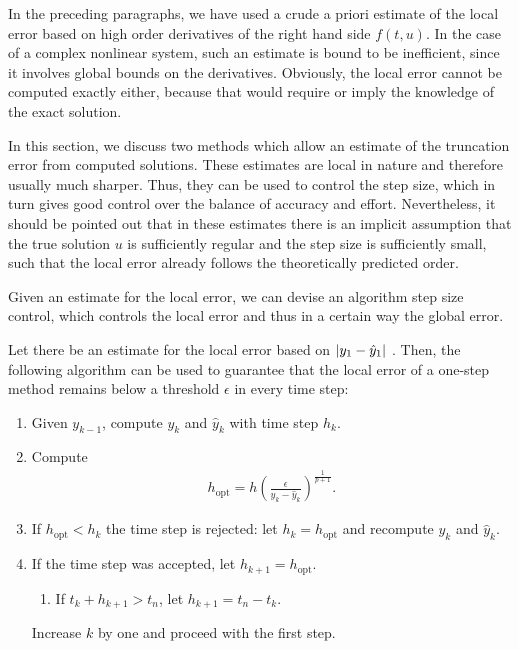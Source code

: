 \begin{intro}
  In the preceding paragraphs, we have used a crude a priori estimate
  of the local error based on high order derivatives of the right hand
  side $f(t,u)$. In the case of a complex nonlinear system, such an
  estimate is bound to be inefficient, since it involves global bounds
  on the derivatives. Obviously, the local error cannot be computed
  exactly either, because that would require or imply the knowledge of
  the exact solution.

  In this section, we discuss two methods which allow an estimate of
  the truncation error from computed solutions. These estimates are
  local in nature and therefore usually much sharper. Thus, they can
  be used to control the step size, which in turn gives good control
  over the balance of accuracy and effort. Nevertheless, it should be
  pointed out that in these estimates there is an implicit assumption
  that the true solution $u$ is sufficiently regular and the step size
  is sufficiently small, such that the local error already follows
  the theoretically predicted order.

  Given an estimate for the local error, we can devise an algorithm
  step size control, which controls the local error and thus in a
  certain way the global error.
\end{intro}

\begin{algorithm}
  Let there be an estimate for the local error based
  on $\lvert y_1 - \hat y_1\rvert$ . Then, the following algorithm can be used
  to guarantee that the local error of a one-step method remains below
  a threshold $\epsilon$ in every time step:

  \begin{enumerate}
  \item Given $y_{k-1}$, compute $y_k$ and $\hat y_k$ with time step $h_k$.
  \item Compute
    \begin{gather}
      \label{eq:explicit:30}
      h_{\text{opt}} = h \left(\frac{\epsilon}{y_k - \hat
          y_k}\right)^{\frac1{p+1}}.
    \end{gather}
  \item If $h_{\text{opt}} < h_k$ the time step is rejected: let
    $h_k = h_{\text{opt}}$ and recompute $y_k$ and $\hat y_k$.
  \item If the time step was accepted, let $h_{k+1} = h_{\text{opt}}$.
    \begin{enumerate}
    \item If $t_k+h_{k+1} > t_n$, let $h_{k+1} = t_n-t_k$.
    \end{enumerate}
    Increase $k$ by one and proceed with the first step.
  \end{enumerate}
\end{algorithm}

